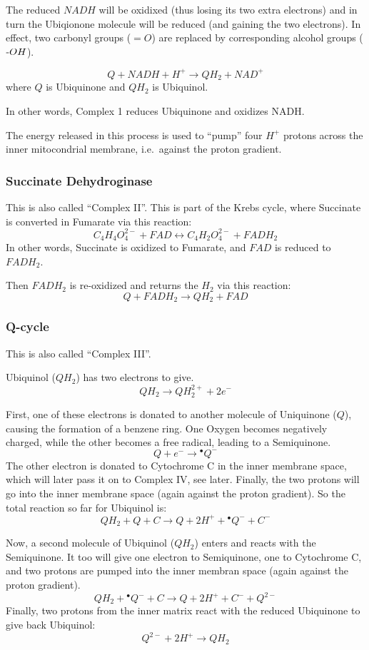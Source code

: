 \documentclass[a4paper,14pt]{extarticle}
\def\mhyphen{{\hbox{-}}}
\begin{document}
The reduced $\mathit{NADH}$ will be oxidixed (thus losing its two extra electrons) and in
turn the Ubiqionone molecule will be reduced (and gaining the two electrons).  In effect,
two carbonyl groups ($=O$) are replaced by corresponding alcohol groups (${\mhyphen}OH$).

\[
    Q + NADH + H^+ \rightarrow QH_2 + NAD^+
\]
where $Q$ is Ubiquinone and $QH_2$ is Ubiquinol.

In other words, Complex 1 reduces Ubiquinone and oxidizes NADH\@.

The energy released in this process is used to ``pump'' four $H^+$ protons across the
inner mitocondrial membrane, i.e.\ against the proton gradient.

\subsubsection{Succinate Dehydroginase}
This is also called ``Complex II''. This is part of the Krebs cycle, where
Succinate is converted in Fumarate via this reaction:
\[
    C_4H_4O_4^{2-} + FAD \leftrightarrow C_4H_2O_4^{2-} + FADH_2
\]
In other words, Succinate is oxidized to Fumarate, and $\mathit{FAD}$ is reduced to
$\mathit{FADH_2}$.

Then $\mathit{FADH_2}$ is re-oxidized and returns the $H_2$ via this reaction:
\[
    Q + FADH_2 \rightarrow QH_2 + FAD
\]

\subsubsection{Q-cycle}
This is also called ``Complex III''.

Ubiquinol ($QH_2$) has two electrons to give.
\[
    QH_2 \rightarrow QH_2^{2+} + 2e^-
\]

First, one of these electrons is donated to another molecule of Uniquinone ($Q$), causing the
formation of a benzene ring.  One Oxygen becomes negatively charged, while the other
becomes a free radical, leading to a Semiquinone.
\[
    Q + e^- \rightarrow {}^{\bullet}Q^{-}
\]
The other electron is donated to Cytochrome C in the inner membrane space, which will later
pass it on to Complex IV, see later. Finally, the two protons will go into the inner
membrane space (again against the proton gradient). So the total reaction so far for
Ubiquinol is:
\[
    QH_2 + Q + C \rightarrow Q + 2H^+ + {}^{\bullet}Q^{-} + C^-
\]

Now, a second molecule of Ubiquinol ($QH_2$) enters and reacts with the Semiquinone.
It too will give one electron to Semiquinone, one to Cytochrome C, and two protons
are pumped into the inner membran space (again against the proton gradient).
\[
    QH_2 + {}^{\bullet}Q^{-} + C \rightarrow Q + 2H^+ + C^- + Q^{2-}
\]
Finally, two protons from the inner matrix react with the reduced Ubiquinone to give back
Ubiquinol:
\[
    Q^{2-} + 2H^+ \rightarrow QH_2
\]
\end{document}
